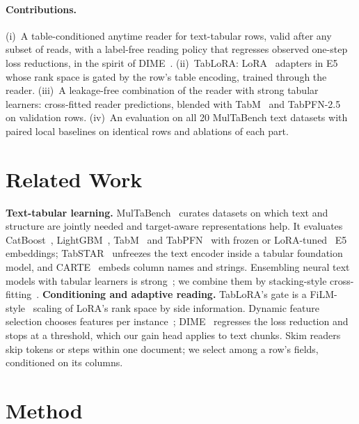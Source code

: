\documentclass{article}
\begin{document}
\paragraph{Contributions.}
(i)~A table-conditioned anytime reader for text-tabular rows, valid after any subset of reads, with a label-free reading policy that regresses observed one-step loss reductions, in the spirit of DIME~\cite{gadgil2024dime}.
(ii)~TabLoRA: LoRA~\cite{hu2022lora} adapters in E5 whose rank space is gated by the row's table encoding, trained through the reader.
(iii)~A leakage-free combination of the reader with strong tabular learners: cross-fitted reader predictions, blended with TabM~\cite{gorishniy2024tabm} and TabPFN-2.5~\cite{grinsztajn2025tabpfn25} on validation rows.
(iv)~An evaluation on all 20 MulTaBench text datasets with paired local baselines on identical rows and ablations of each part.

\section{Related Work}

\textbf{Text-tabular learning.}
MulTaBench~\cite{arazi2026multabench} curates datasets on which text and structure are jointly needed and target-aware representations help.
It evaluates CatBoost~\cite{prokhorenkova2018catboost}, LightGBM~\cite{ke2017lightgbm}, TabM~\cite{gorishniy2024tabm} and TabPFN~\cite{hollmann2025tabpfn,grinsztajn2025tabpfn25} with frozen or LoRA-tuned~\cite{hu2022lora} E5 embeddings; TabSTAR~\cite{arazi2025tabstar} unfreezes the text encoder inside a tabular foundation model, and CARTE~\cite{kim2024carte} embeds column names and strings.
Ensembling neural text models with tabular learners is strong~\cite{shi2021multimodal}; we combine them by stacking-style cross-fitting~\cite{wolpert1992stacked}.
\textbf{Conditioning and adaptive reading.}
TabLoRA's gate is a FiLM-style~\cite{perez2018film} scaling of LoRA's rank space by side information.
Dynamic feature selection chooses features per instance~\cite{shim2018afa,covert2023dfs}; DIME~\cite{gadgil2024dime} regresses the loss reduction and stops at a threshold, which our gain head applies to text chunks.
Skim readers~\cite{yu2017skim,seo2018skimrnn,graves2016act} skip tokens or steps within one document; we select among a row's fields, conditioned on its columns.

\section{Method}
\end{document}
